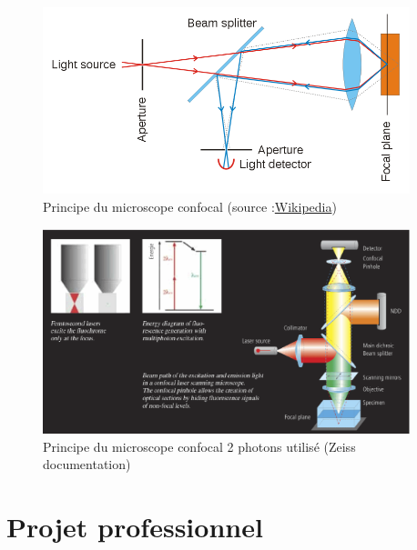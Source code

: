 \begin{figure}[htb]
\begin{center}
\leavevmode
\includegraphics[width=0.95\textwidth]{pictures/ConfocalPrinciple}
\end{center}
\caption{Principe du microscope confocal (source :\href{http://en.wikipedia.org/wiki/File:Confocalprinciple.svg}{Wikipedia})}
\label{fig:ConfocalPrinciple}
\end{figure}

\begin{figure}[htb]
\begin{center}
\leavevmode
\includegraphics[width=0.95\textwidth]{pictures/ConfocalZeissPrinciple}
\end{center}
\caption{Principe du microscope confocal 2 photons utilisé (Zeiss documentation)}
\label{fig:Confocal2photonsPrinciple}
\end{figure}

\clearpage





%


\chapter{Projet professionnel}

